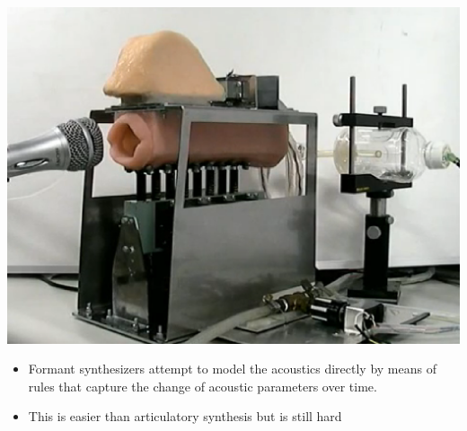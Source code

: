 \documentclass[a4paper,landscape,headrule,footrule,xetex]{foils}
\begin{document}

\includegraphics[height=\textheight]{../pics/mouth.eps} %


\begin{itemize}
\item Formant synthesizers attempt to model the acoustics directly by means of rules that capture the change of acoustic parameters over time.
\item This is easier than articulatory synthesis but is still hard
\end{itemize}
\end{document}

